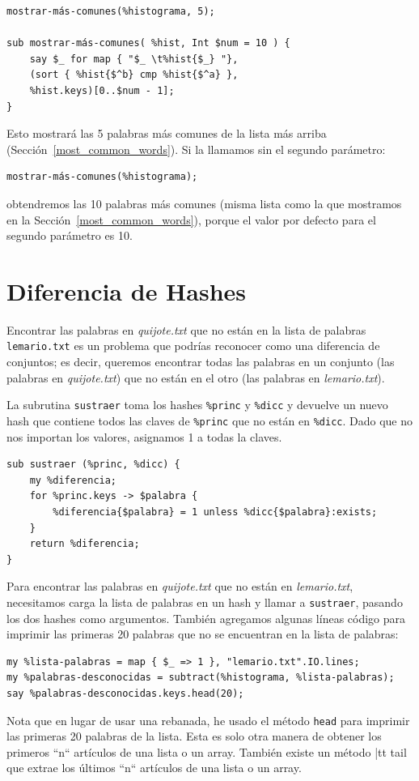 \begin{verbatim}
mostrar-más-comunes(%histograma, 5);

sub mostrar-más-comunes( %hist, Int $num = 10 ) {
    say $_ for map { "$_ \t%hist{$_} "}, 
    (sort { %hist{$^b} cmp %hist{$^a} },
    %hist.keys)[0..$num - 1];
}
\end{verbatim}

Esto mostrará las 5 palabras más comunes de la lista más
arriba (Sección~\ref{most_common_words}). Si la llamamos
sin el segundo parámetro:

\begin{verbatim}
mostrar-más-comunes(%histograma);
\end{verbatim}

obtendremos las 10 palabras más comunes (misma lista como la
que mostramos en la Sección~\ref{most_common_words}), porque el 
valor por defecto para el segundo parámetro es 10.

\section{Diferencia de Hashes}
\label{hashsub}

Encontrar las palabras en \emph{quijote.txt} que no están en la lista
de palabras {\tt lemario.txt} es un problema que podrías reconocer como una 
diferencia de conjuntos; es decir, queremos encontrar todas las palabras
en un conjunto (las palabras en \emph{quijote.txt}) que no están en el
otro (las palabras en \emph{lemario.txt}).

La subrutina {\tt sustraer} toma los hashes \verb|%princ| y \verb|%dicc|
y devuelve un nuevo hash que contiene todos las claves de \verb|%princ|
que no están en \verb|%dicc|. Dado que no nos importan los valores, asignamos
1 a todas la claves.

\begin{verbatim}
sub sustraer (%princ, %dicc) {
	my %diferencia;
	for %princ.keys -> $palabra {
		%diferencia{$palabra} = 1 unless %dicc{$palabra}:exists;
	}
	return %diferencia;
}
\end{verbatim}
%
Para encontrar las palabras en \emph{quijote.txt} que no están en 
\emph{lemario.txt}, necesitamos carga la lista de palabras en un hash
y llamar a {\tt sustraer}, pasando los dos hashes como argumentos. 
También agregamos algunas líneas código para imprimir las primeras 20 palabras 
que no se encuentran en la lista de palabras:

\begin{verbatim}
my %lista-palabras = map { $_ => 1 }, "lemario.txt".IO.lines;
my %palabras-desconocidas = subtract(%histograma, %lista-palabras);
say %palabras-desconocidas.keys.head(20);
\end{verbatim}
%
Nota que en lugar de usar una rebanada, he usado el método {\tt head}
para imprimir las primeras 20 palabras de la lista. Esta es solo otra
manera de obtener los primeros ``n`` artículos de una lista o un
array. También existe un método {|tt tail} que extrae los últimos
``n`` artículos de una lista o un array.

